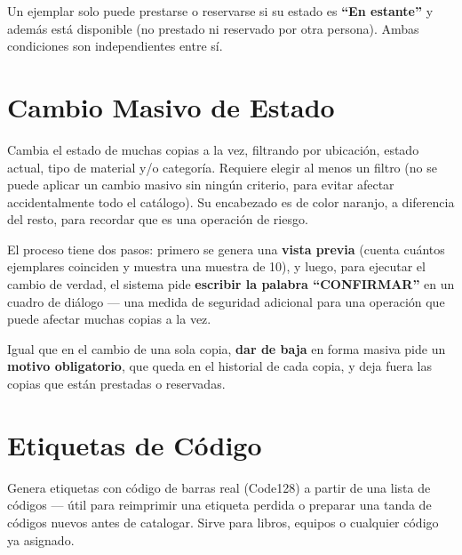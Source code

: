 \documentclass[11pt,a4paper]{report}
\begin{document}
\begin{importante}
Un ejemplar solo puede prestarse o reservarse si su estado es
\textbf{``En estante''} y además está disponible (no prestado ni
reservado por otra persona). Ambas condiciones son independientes entre
sí.
\end{importante}

\section{Cambio Masivo de Estado}


Cambia el estado de muchas copias a la vez, filtrando por ubicación,
estado actual, tipo de material y/o categoría. Requiere elegir al menos
un filtro (no se puede aplicar un cambio masivo sin ningún criterio, para
evitar afectar accidentalmente todo el catálogo). Su encabezado es de
color naranjo, a diferencia del resto, para recordar que es una operación
de riesgo.


El proceso tiene dos pasos: primero se genera una \textbf{vista previa}
(cuenta cuántos ejemplares coinciden y muestra una muestra de 10), y
luego, para ejecutar el cambio de verdad, el sistema pide
\textbf{escribir la palabra ``CONFIRMAR''} en un cuadro de diálogo --- una
medida de seguridad adicional para una operación que puede afectar
muchas copias a la vez.

Igual que en el cambio de una sola copia, \textbf{dar de baja} en forma
masiva pide un \textbf{motivo obligatorio}, que queda en el historial de
cada copia, y deja fuera las copias que están prestadas o reservadas.

\section{Etiquetas de Código}


Genera etiquetas con código de barras real (Code128) a partir de una
lista de códigos --- útil para reimprimir una etiqueta perdida o preparar
una tanda de códigos nuevos antes de catalogar. Sirve para libros,
equipos o cualquier código ya asignado.

\end{document}
